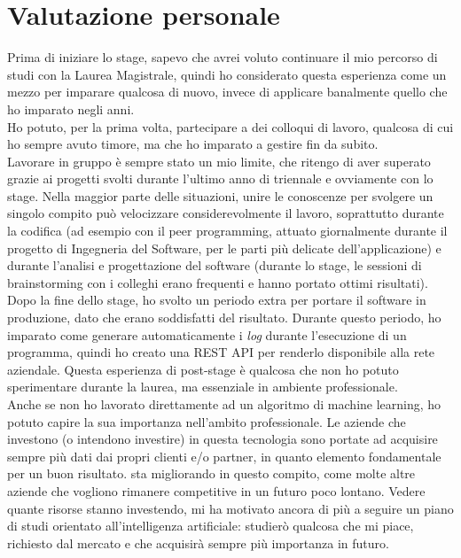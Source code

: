 \section{Valutazione personale}
Prima di iniziare lo stage, sapevo che avrei voluto continuare il mio percorso di studi con la Laurea Magistrale, quindi ho considerato questa esperienza come un mezzo per imparare qualcosa di nuovo, invece di applicare banalmente quello che ho imparato negli anni.\\
Ho potuto, per la prima volta, partecipare a dei colloqui di lavoro, qualcosa di cui ho sempre avuto timore, ma che ho imparato a gestire fin da subito.\\
Lavorare in gruppo è sempre stato un mio limite, che ritengo di aver superato grazie ai progetti svolti durante l'ultimo anno di triennale e ovviamente con lo stage. Nella maggior parte delle situazioni, unire le conoscenze per svolgere un singolo compito può velocizzare considerevolmente il lavoro, soprattutto durante la codifica (ad esempio con il peer programming, attuato giornalmente durante il progetto di Ingegneria del Software, per le parti più delicate dell'applicazione) e durante l'analisi e progettazione del software (durante lo stage, le sessioni di brainstorming con i colleghi erano frequenti e hanno portato ottimi risultati).\\
Dopo la fine dello stage, ho svolto un periodo extra per portare il software in produzione, dato che erano soddisfatti del risultato. Durante questo periodo, ho imparato come generare automaticamente i \textit{log} durante l'esecuzione di un programma, quindi ho creato una REST API per renderlo disponibile alla rete aziendale. Questa esperienza di post-stage è qualcosa che non ho potuto sperimentare durante la laurea, ma essenziale in ambiente professionale.\\
Anche se non ho lavorato direttamente ad un algoritmo di machine learning, ho potuto capire la sua importanza nell'ambito professionale. Le aziende che investono (o intendono investire) in questa tecnologia sono portate ad acquisire sempre più dati dai propri clienti e/o partner, in quanto elemento fondamentale per un buon risultato. \company{} sta migliorando in questo compito, come molte altre aziende che vogliono rimanere competitive in un futuro poco lontano. Vedere quante risorse stanno investendo, mi ha motivato ancora di più a seguire un piano di studi orientato all'intelligenza artificiale: studierò qualcosa che mi piace, richiesto dal mercato e che acquisirà sempre più importanza in futuro.